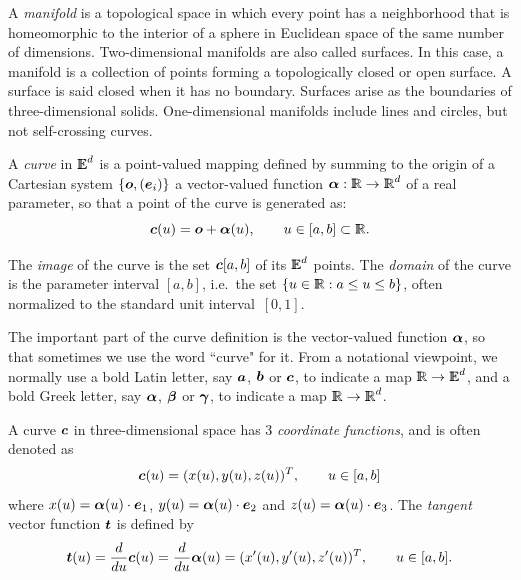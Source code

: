 \begin{coding}[Algebraic computation of FE = $\delta_1$]
A \emph{manifold} is a topological space in which every point has a neighborhood that is homeomorphic to the interior of a sphere in Euclidean space of the same number of dimensions. 
Two-dimensional manifolds are also called surfaces.  
In this case, a manifold is a collection of points forming a topologically closed or open surface. 
A surface is said closed when it has no boundary.
Surfaces arise as the boundaries of three-dimensional solids.
One-dimensional manifolds include lines and circles, but not self-crossing curves. 


\begin{definition}[Curve]
A \emph{curve} in $ \mathbb{I\!\!E}^d$ is a point-valued mapping defined by summing
to the origin of a Cartesian system $\{ {\mbox{\boldmath $o$}}, ({\mbox{\boldmath $e$}}_{i}) \}$ a
vector-valued function ${\mbox{\boldmath $\alpha$}}: \mathbb{I\!\!R} \rightarrow \mathbb{I\!\!R}^{d}$ of a real
parameter, so that a point of the curve is generated as:
\[
{\mbox{\boldmath $c$}}(u) = {\mbox{\boldmath $o$}} + {\mbox{\boldmath $\alpha$}}(u), \qquad u\in[a,b]\subset\mathbb{I\!\!R}.
\]
\end{definition}


\begin{definition}
The \emph{image} of the curve is the set ${\mbox{\boldmath $c$}}[a,b]$ of its $ \mathbb{I\!\!E}^d$
points.  The \emph{domain} of the curve is the parameter interval
$[a,b]$, i.e.~the set $\{u\in\mathbb{I\!\!R} : a\leq u\leq b \}$, often norm\-alized to
the standard unit interval~$[0,1]$.
\end{definition}


The important part of the curve definition is the vector-valued
function ${{\mbox{\boldmath $\alpha$}}}$, so that sometimes we use the word ``curve" for
it.  From a notational viewpoint, we normally use a bold Latin letter,
say ${\mbox{\boldmath $a$}}$, ${\mbox{\boldmath $b$}}$ or ${\mbox{\boldmath $c$}}$, to indicate a map $\mathbb{I\!\!R} \rightarrow
\mathbb{I\!\!E}^d$, and a bold Greek letter, say ${\mbox{\boldmath $\alpha$}}$, ${\mbox{\boldmath $\beta$}}$ or
${\mbox{\boldmath $\gamma$}}$, to indicate a map $\mathbb{I\!\!R} \rightarrow \mathbb{I\!\!R}^d$.  



\begin{condition}[3D curve]

A curve ${\mbox{\boldmath $c$}}$ in three-dimensional space has 3 \emph{coordinate
functions}, and is often denoted as
\[
{\mbox{\boldmath $c$}}(u) = (x(u),  y(u), z(u))^T,
\qquad u\in [a,b]
\]
where ${x}(u) = {\mbox{\boldmath $\alpha$}}(u) \cdot {\mbox{\boldmath $e$}}_{1}$, ${y}(u) =
{\mbox{\boldmath $\alpha$}}(u) \cdot {\mbox{\boldmath $e$}}_{2}$ and ${z}(u) = {\mbox{\boldmath $\alpha$}}(u) \cdot
{\mbox{\boldmath $e$}}_{3}$.  The \emph{tangent} vector function ${\mbox{\boldmath $t$}}$ is defined
by
\[
{\mbox{\boldmath $t$}}(u) = {d  \over d u} {\mbox{\boldmath $c$}}(u) = {d  \over d u} {\mbox{\boldmath $\alpha$}}(u) =
(x'(u), y'(u), z'(u))^T, \qquad u\in [a,b].
\]

\end{condition}


\end{coding}
